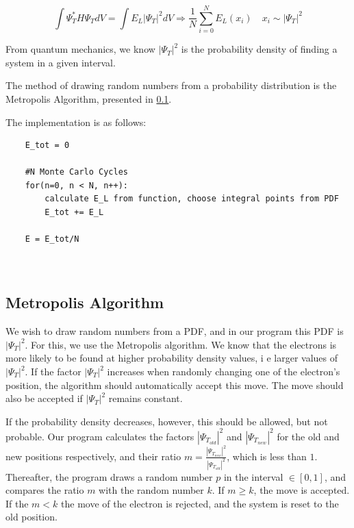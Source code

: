 \documentclass[norsk,a4paper,12pt]{article}
\begin{document}
\begin{equation}
    \int \Psi_T^* H \Psi_T dV = \int E_L |\Psi_T|^2 dV \Rightarrow \frac{1}{N} \sum_{i=0}^N E_L(x_i) \quad x_i \sim |\Psi_T|^2  
\end{equation}

From quantum mechanics, we know $|\Psi_T|^2$ is the probability density of finding a system in a given interval. 

The method of drawing random numbers from a probability distribution is the Metropolis Algorithm, presented in \ref{MetropolisAlgorithm}. 

The implementation is as follows:

\begin{lstlisting}
    E_tot = 0
    
    #N Monte Carlo Cycles
    for(n=0, n < N, n++):
        calculate E_L from function, choose integral points from PDF
        E_tot += E_L
        
    E = E_tot/N
        
    
\end{lstlisting}

\subsection{Metropolis Algorithm} \label{MetropolisAlgorithm}
We wish to draw random numbers from a PDF, and in our program this PDF is $|\Psi_T|^2$. For this, we use the Metropolis algorithm. We know that the electrons is more likely to be found at higher probability density values, i e larger values of $|\Psi_T|^2$. If the factor $|\Psi_T|^2$ increases when randomly changing one of the electron's position, the algorithm should automatically accept this move. The move should also be accepted if $|\Psi_T|^2$ remains constant.

\par 
\vspace{2mm}

If the probability density decreases, however, this should be allowed, but not probable. Our program calculates the factors $|\Psi_{T_{old}}|^2$ and $|\Psi_{T_{new}}|^2$ for the old and new positions respectively, and their ratio $ m = \frac{|\Psi_{T_{new}}|^2}{|\Psi_{T_{old}}|^2}$, which is less than $1$. Thereafter, the program draws a random number $p$ in the interval $\in [0, 1]$, and compares the ratio $m$ with the random number $k$. If $m \geq k$, the move is accepted. If the $m < k$ the move of the electron is rejected, and the system is reset to the old position. 
\end{document}
